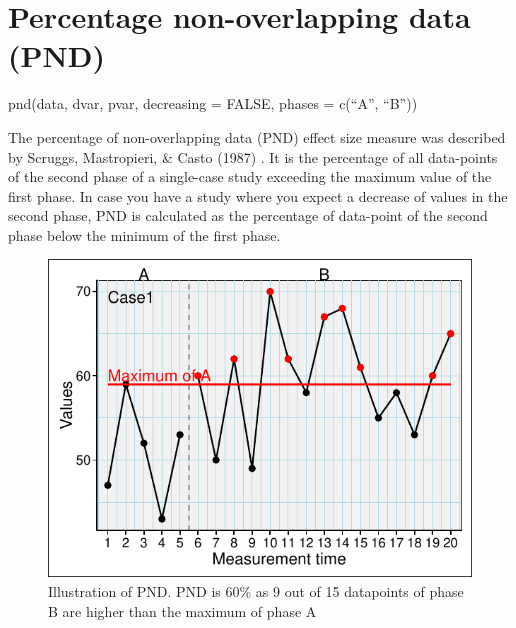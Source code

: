 \documentclass[
  letterpaper,
  DIV=11,
  numbers=noendperiod]{scrreprt}
\begin{document}
\hypertarget{percentage-non-overlapping-data-pnd}{%
\section{Percentage non-overlapping data
(PND)}\label{percentage-non-overlapping-data-pnd}}

\begin{tcolorbox}[enhanced jigsaw, toprule=.15mm, colframe=quarto-callout-tip-color-frame, left=2mm, colback=white, breakable, bottomrule=.15mm, arc=.35mm, rightrule=.15mm, leftrule=.75mm, opacityback=0]
\begin{minipage}[t]{5.5mm}
\textcolor{quarto-callout-tip-color}{\faLightbulb}
\end{minipage}%
\begin{minipage}[t]{\textwidth - 5.5mm}
pnd(data, dvar, pvar, decreasing = FALSE, phases = c(``A'',
``B''))\end{minipage}%
\end{tcolorbox}

The percentage of non-overlapping data (PND) effect size measure was
described by Scruggs, Mastropieri, \& Casto (1987) . It is the
percentage of all data-points of the second phase of a single-case study
exceeding the maximum value of the first phase. In case you have a study
where you expect a decrease of values in the second phase, PND is
calculated as the percentage of data-point of the second phase below the
minimum of the first phase.

\begin{figure}

{\centering \includegraphics{./ch_overlapping_indices_files/figure-pdf/unnamed-chunk-9-1.pdf}

}

\caption{Illustration of PND. PND is 60\% as 9 out of 15 datapoints of
phase B are higher than the maximum of phase A}

\end{figure}
\end{document}
